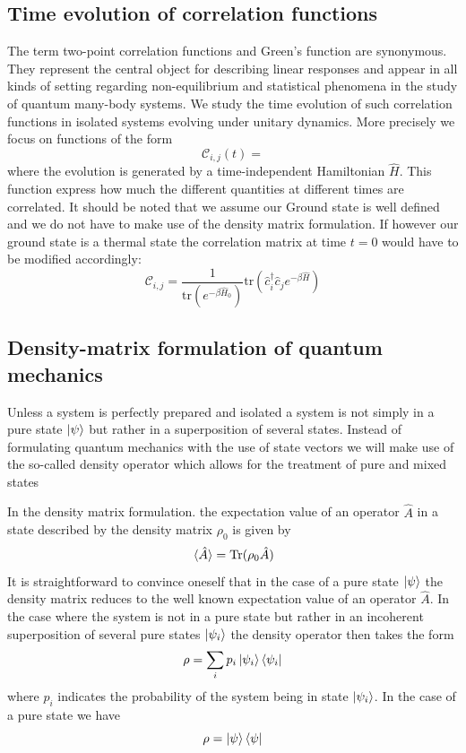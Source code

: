 \documentclass[11pt, a4paper]{article}
\theoremstyle{definition} %
\begin{document}
	\subsection{Time evolution of correlation functions}
	The term two-point correlation functions and Green's function are synonymous. They represent the central object for describing linear responses and appear in all kinds of setting regarding non-equilibrium and statistical phenomena in the study of quantum many-body systems. We study the time evolution of such correlation functions in isolated systems evolving under unitary dynamics. More precisely we focus on functions of the form
	\begin{equation}
		\mathcal{C}_{i,j}(t) = 
	\end{equation}
	where the evolution is generated by a time-independent Hamiltonian $\hat{H}$. This function express how much the different quantities at different times are correlated. It should be noted that we assume our Ground state is well defined and we do not have to make use of the density matrix formulation. If however our ground state is a thermal state the correlation matrix at time $t=0$ would have to be modified accordingly:
\begin{equation}
	\mathcal{C}_{i,j} = \frac{1}{\text{tr}(e^{-\beta \hat{H}_0})} \text{tr}(\hat{c}_i^\dagger \hat{c}_j e^{-\beta \hat{H}})
\end{equation}
	
	\subsection{Density-matrix formulation of quantum mechanics}
	Unless a system is perfectly prepared and isolated a system is not simply in a pure state $\ket{\psi}$ but rather in a superposition of several states. Instead of formulating quantum mechanics with the use of state vectors we will make use of the so-called density operator which allows for the treatment of pure and mixed states
	
	
	In the density matrix formulation. the expectation value of an operator $\hat{A}$ in a state described by the density matrix $\rho_0$ is given by
	\begin{equation}
		\expval*{\hat{A}} = \text{Tr}(\rho_0 \hat{A})
	\end{equation}
	It is straightforward to convince oneself that in the case of a pure state $\ket{\psi}$ the density matrix reduces to the well known expectation value of an operator $\hat{A}$. In the case where the system is not in a pure state but rather in an incoherent superposition of several pure states $\ket{\psi_i}$ the density operator then takes the form
	\begin{equation}
		\rho = \sum_i p_i \ket{\psi_i}\bra{\psi_i}
	\end{equation}
	where $p_i$ indicates the probability of the system being in state $\ket{\psi_i}$. In the case of a pure state we have
	\begin{equation}
		\rho = \ket{\psi}\bra{\psi}
	\end{equation}
	
\end{document}
